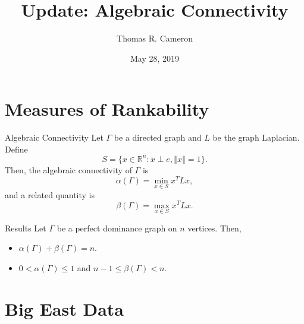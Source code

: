 \documentclass{beamer}
\title{Update: Algebraic Connectivity}
\author{Thomas R. Cameron}
\institute{Davidson College}
\date{May 28, 2019}
\newcommand\norm[1]{\left\Vert#1\right\Vert}
\begin{document}
\begin{frame}
	\titlepage
\end{frame}


\section{Measures of Rankability}

\begin{frame}{Algebraic Connectivity}
Let $\Gamma$ be a directed graph and $L$ be the graph Laplacian.
\vfill
Define
\[
S=\{x\in\mathbb{R}^{n}\colon x\perp e, \norm{x}=1\}.
\]
\vfill
Then, the algebraic connectivity of $\Gamma$ is
\[
\alpha(\Gamma) = \min_{x\in S}x^{T}Lx,
\]
\vfill
and a related quantity is
\[
\beta(\Gamma) = \max_{x\in S}x^{T}Lx.
\]
\end{frame}

\begin{frame}{Results}
Let $\Gamma$ be a perfect dominance graph on $n$ vertices.
Then,
\vfill
\begin{itemize}
\item	$\alpha(\Gamma)+\beta(\Gamma)=n$.
\vfill
\item $0<\alpha(\Gamma)\leq1$ and $n-1\leq \beta(\Gamma) <n$.
\end{itemize}
\end{frame}

\section{Big East Data}
\end{document}
